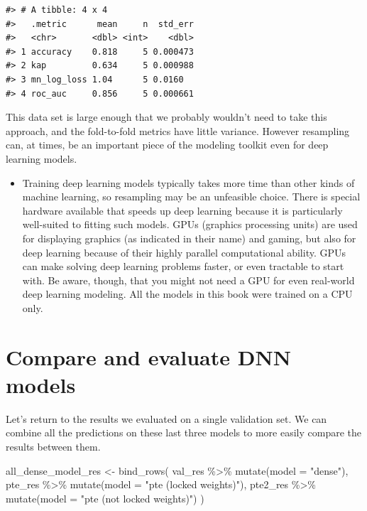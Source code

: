 \documentclass[
]{krantz}
\makeatletter
\newenvironment{Shaded}{\begin{snugshade}}{\end{snugshade}}
\newcommand{\AttributeTok}[1]{\textcolor[rgb]{0.77,0.63,0.00}{#1}}
\newcommand{\FunctionTok}[1]{\textcolor[rgb]{0.00,0.00,0.00}{#1}}
\newcommand{\NormalTok}[1]{#1}
\newcommand{\OtherTok}[1]{\textcolor[rgb]{0.56,0.35,0.01}{#1}}
\newcommand{\SpecialCharTok}[1]{\textcolor[rgb]{0.00,0.00,0.00}{#1}}
\newcommand{\StringTok}[1]{\textcolor[rgb]{0.31,0.60,0.02}{#1}}
\newenvironment{kframe}{%
\medskip{}
\setlength{\fboxsep}{.8em}
 \def\at@end@of@kframe{}%
 \ifinner\ifhmode%
  \def\at@end@of@kframe{\end{minipage}}%
  \begin{minipage}{\columnwidth}%
 \fi\fi%
 \def\FrameCommand##1{\hskip\@totalleftmargin \hskip-\fboxsep
 \colorbox{shadecolor}{##1}\hskip-\fboxsep
     \hskip-\linewidth \hskip-\@totalleftmargin \hskip\columnwidth}%
 \MakeFramed {\advance\hsize-\width
   \@totalleftmargin\z@ \linewidth\hsize
   \@setminipage}}%
 {\par\unskip\endMakeFramed%
 \at@end@of@kframe}
\renewenvironment{Shaded}{\begin{kframe}}{\end{kframe}}
\newenvironment{rmdblock}[1]
  {\begin{shaded*}
  \begin{itemize}[left = -1cm, labelsep = 1cm]
  \renewcommand{\labelitemi}{
    \raisebox{-.7\height}[0pt][0pt]{
      {\setkeys{Gin}{width=3em,keepaspectratio}\texttt{[image: images/\#1]}}
    }
  }
 
  \item
  }
  {
  \end{itemize}
  \end{shaded*}
  }
\newenvironment{rmdnote}
  {\begin{rmdblock}{note}}
  {\end{rmdblock}}
\makeatother
\begin{document}
\begin{verbatim}
#> # A tibble: 4 x 4
#>   .metric      mean     n  std_err
#>   <chr>       <dbl> <int>    <dbl>
#> 1 accuracy    0.818     5 0.000473
#> 2 kap         0.634     5 0.000988
#> 3 mn_log_loss 1.04      5 0.0160  
#> 4 roc_auc     0.856     5 0.000661
\end{verbatim}

This data set is large enough that we probably wouldn't need to take this approach, and the fold-to-fold metrics have little variance. However resampling can, at times, be an important piece of the modeling toolkit even for deep learning models.


\begin{rmdnote}
Training deep learning models typically takes more time than other kinds
of machine learning, so resampling may be an unfeasible choice. There is
special hardware available that speeds up deep learning because it is
particularly well-suited to fitting such models. GPUs (graphics
processing units) are used for displaying graphics (as indicated in
their name) and gaming, but also for deep learning because of their
highly parallel computational ability. GPUs can make solving deep
learning problems faster, or even tractable to start with. Be aware,
though, that you might not need a GPU for even real-world deep learning
modeling. All the models in this book were trained on a CPU only.
\end{rmdnote}

\hypertarget{compare-and-evaluate-dnn-models}{%
\section{Compare and evaluate DNN models}\label{compare-and-evaluate-dnn-models}}

Let's return to the results we evaluated on a single validation set. We can combine all the predictions on these last three models to more easily compare the results between them.

\begin{Shaded}
\begin{Highlighting}[]
\NormalTok{all\_dense\_model\_res }\OtherTok{\textless{}{-}} \FunctionTok{bind\_rows}\NormalTok{(}
\NormalTok{  val\_res }\SpecialCharTok{\%\textgreater{}\%} \FunctionTok{mutate}\NormalTok{(}\AttributeTok{model =} \StringTok{"dense"}\NormalTok{),}
\NormalTok{  pte\_res }\SpecialCharTok{\%\textgreater{}\%} \FunctionTok{mutate}\NormalTok{(}\AttributeTok{model =} \StringTok{"pte (locked weights)"}\NormalTok{),}
\NormalTok{  pte2\_res }\SpecialCharTok{\%\textgreater{}\%} \FunctionTok{mutate}\NormalTok{(}\AttributeTok{model =} \StringTok{"pte (not locked weights)"}\NormalTok{)}
\NormalTok{)}
\end{Highlighting}
\end{Shaded}
\end{document}
